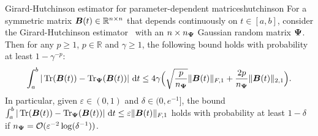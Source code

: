 \begin{theorem}{Girard-Hutchinson estimator for parameter-dependent matrices}{hutchinson}
    For a symmetric matrix $\boldsymbol{B}(t) \in \mathbb{R}^{n \times n}$ that depends continuously on $t \in [a, b]$, consider the  Girard-Hutchinson estimator~ with an $n\times n_{\boldsymbol{\Psi}}$ Gaussian random matrix $\boldsymbol{\Psi}$. Then for any $p \geq 1$, $p \in \mathbb{R}$ and $\gamma \geq 1$, the following bound holds with probability at least $1 - \gamma^{-p}$:
    \begin{equation} \label{eq:ghbound}
        \int_{a}^{b} |\operatorname{Tr}(\boldsymbol{B}(t)) - \operatorname{Tr}_{\boldsymbol{\Psi}}(\boldsymbol{B}(t))|~\mathrm{d}t \leq 4 \gamma \Big( \sqrt{\frac{p}{n_{\boldsymbol{\Psi}}}}  \|\boldsymbol{B}(t)\|_{F,1} + \frac{2 p}{n_{\boldsymbol{\Psi}}} \|\boldsymbol{B}(t)\|_{2,1} \Big).
    \end{equation}
In particular, given $\varepsilon \in (0, 1)$ and $\delta \in (0, e^{-1}]$, the bound $\int_{a}^{b} | \operatorname{Tr}(\boldsymbol{B}(t)) - \operatorname{Tr}_{\boldsymbol{\Psi}}(\boldsymbol{B}(t)) | ~\mathrm{d}t \leq \varepsilon \|\boldsymbol{B}(t)\|_{F,1}$ holds 
    with probability at least $1-\delta$ if $n_{\boldsymbol{\Psi}} = \mathcal{O}(\varepsilon^{-2} \log(\delta^{-1}))$.
\end{theorem}
